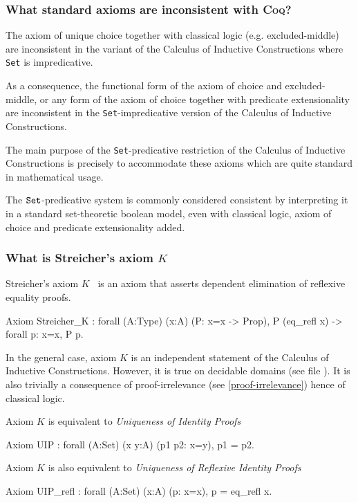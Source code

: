 \documentclass[a4paper,pdftex]{article}
\def\Question#1{\stepcounter{question}\subsubsection{#1}}
\def\Coq{\textsc{Coq}}
\def\Set{{\tt Set}}
\newcommand\vfile[2]{\ahref{#1}{\tt {#2}.v}}
\begin{document}
\Question{What standard axioms are inconsistent with {\Coq}?}

The axiom of unique choice together with classical logic
(e.g. excluded-middle) are inconsistent in the variant of the Calculus
of Inductive Constructions where {\Set} is impredicative.

As a consequence, the functional form of the axiom of choice and
excluded-middle, or any form of the axiom of choice together with
predicate extensionality are inconsistent in the {\Set}-impredicative
version of the Calculus of Inductive Constructions.

The main purpose of the \Set-predicative restriction of the Calculus
of Inductive Constructions is precisely to accommodate these axioms
which are quite standard in mathematical usage.

The $\Set$-predicative system is commonly considered consistent by
interpreting it in a standard set-theoretic boolean model, even with
classical logic, axiom of choice and predicate extensionality added.

\Question{What is Streicher's axiom $K$}
\label{Streicher}

Streicher's axiom $K$~\cite{HofStr98} is an axiom that asserts
dependent elimination of reflexive equality proofs.

\begin{coq_example*}
Axiom Streicher_K :
  forall (A:Type) (x:A) (P: x=x -> Prop),
    P (eq_refl x) -> forall p: x=x, P p.
\end{coq_example*}

In the general case, axiom $K$ is an independent statement of the
Calculus of Inductive Constructions.  However, it is true on decidable
domains (see file \vfile{\LogicEqdepDec}{Eqdep\_dec}). It is also
trivially a consequence of proof-irrelevance (see
\ref{proof-irrelevance}) hence of classical logic.

Axiom $K$ is equivalent to {\em Uniqueness of Identity Proofs} \cite{HofStr98}

\begin{coq_example*}
Axiom UIP : forall (A:Set) (x y:A) (p1 p2: x=y), p1 = p2.
\end{coq_example*}

Axiom $K$ is also equivalent to {\em Uniqueness of Reflexive Identity Proofs} \cite{HofStr98}

\begin{coq_example*}
Axiom UIP_refl : forall (A:Set) (x:A) (p: x=x), p = eq_refl x.
\end{coq_example*}
\end{document}
